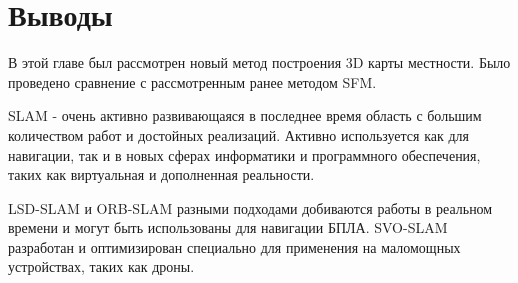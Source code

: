 \section{Выводы}

В этой главе был рассмотрен новый метод построения 3D карты местности. Было проведено сравнение с рассмотренным ранее методом SFM.

SLAM - очень активно развивающаяся в последнее время область с большим количеством работ и достойных реализаций. Активно используется как для навигации, так и в новых сферах информатики и программного обеспечения, таких как виртуальная и дополненная реальности.

LSD-SLAM и ORB-SLAM разными подходами добиваются работы в реальном времени и могут быть использованы для навигации БПЛА. SVO-SLAM разработан и оптимизирован специально для применения на маломощных устройствах, таких как дроны.
